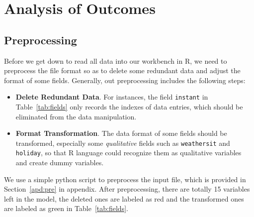 \section{Analysis of Outcomes}
\label{sec:outcome}

\subsection{Preprocessing}
Before we get down to read all data into our workbench in R, we need to preprocess the file format so as to delete some redundant data and adjust the format of some fields. Generally, out preprocessing includes the following steps:
\begin{itemize}
  \item \textbf{Delete Redundant Data}. For instances, the field \texttt{instant} in  Table~\ref{tab:fields} only records the indexes of data entries, which should be eliminated from the data manipulation.
  \item \textbf{Format Transformation}. The data format of some fields should be transformed, especially some \emph{qualitative} fields such as \texttt{weathersit} and \texttt{holiday}, so that R language could recognize them as qualitative variables and create dummy variables.
\end{itemize}

We use a simple python script to preprocess the input file, which is provided in Section~\ref{apd:pre} in appendix. After preprocessing, there are totally 15 variables left in the model, the deleted ones are labeled as {\color{red}red} and the transformed ones are labeled as {\color{green}green} in Table~\ref{tab:fields}.

